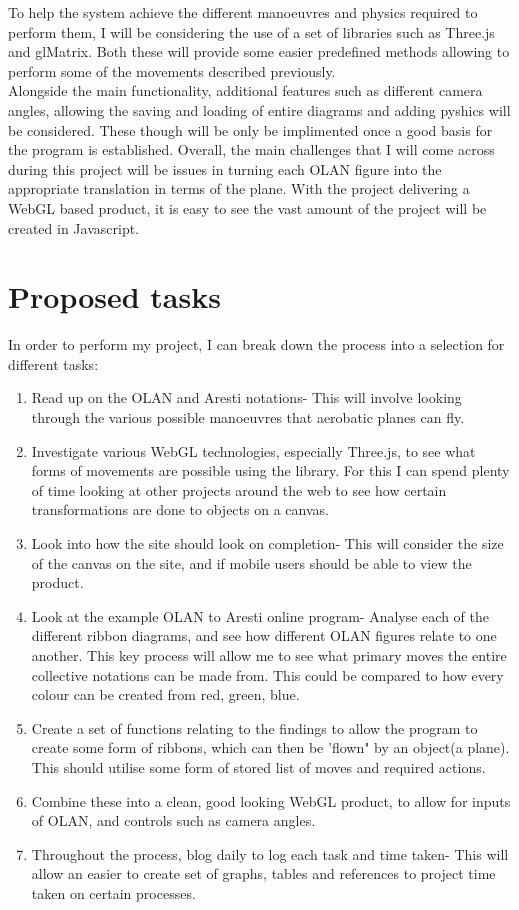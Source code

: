 \documentclass[11pt,fleqn,twoside]{article}
\begin{document}
To help the system achieve the different manoeuvres and physics required to perform them, I will be considering the use of a set of libraries such as Three.js\cite{ThreeJs} and glMatrix\cite{glMatrix}. Both these will provide some easier predefined methods allowing to perform some of the movements described previously. \\
Alongside the main functionality, additional features such as different camera angles, allowing the saving and loading of entire diagrams and adding pyshics will be considered. These though will be only be implimented once a good basis for the program is established. Overall, the main challenges that I will come across during this project will be issues in turning each OLAN figure into the appropriate translation in terms of the plane. With the project delivering a WebGL based product, it is easy to see the vast amount of the project will be created in Javascript.

\section{Proposed tasks}
In order to perform my project, I can break down the process into a selection for different tasks:
\begin{enumerate}
\item Read up on the OLAN and Aresti\cite{Aresti} notations- This will involve looking through the various possible manoeuvres that aerobatic planes can fly.
\item Investigate various WebGL technologies, especially Three.js, to see what forms of movements are possible using the library. For this I can spend plenty of time looking at other projects\cite{ThreejsDemo} around the web to see how certain transformations are done to objects on a canvas.
\item Look into how the site should look on completion- This will consider the size of the canvas on the site, and if mobile users should be able to view the product.
\item Look at the example OLAN to Aresti online program- Analyse each of the different ribbon diagrams, and see how different OLAN figures relate to one another. This key process will allow me to see what primary moves the entire collective notations can be made from. This could be compared to how every colour can be created from red, green, blue.
\item Create a set of functions relating to the findings to allow the program to create some form of ribbons, which can then be 'flown" by an object(a plane). This should utilise some form of stored list of moves and required actions.
\item Combine these into a clean, good looking WebGL product, to allow for inputs of OLAN, and controls such as camera angles.
\item Throughout the process, blog daily to log each task and time taken- This will allow an easier to create set of graphs, tables and references to project time taken on certain processes.
\end{enumerate}
\end{document}
